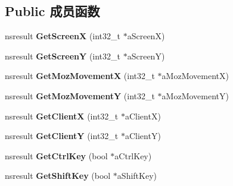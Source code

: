 \subsection*{Public 成员函数}
\begin{DoxyCompactItemize}
\item 
\mbox{\label{interfacens_i_d_o_m_mouse_event_ad8e732ec26ae471ddb1b8fcf50f2270b}} 
nsresult {\bfseries Get\+ScreenX} (int32\+\_\+t $\ast$a\+ScreenX)
\item 
\mbox{\label{interfacens_i_d_o_m_mouse_event_a87badc3e6e93d45ec315e3f288113afd}} 
nsresult {\bfseries Get\+ScreenY} (int32\+\_\+t $\ast$a\+ScreenY)
\item 
\mbox{\label{interfacens_i_d_o_m_mouse_event_aa1742956f4f5a3d533271fd10fb814ae}} 
nsresult {\bfseries Get\+Moz\+MovementX} (int32\+\_\+t $\ast$a\+Moz\+MovementX)
\item 
\mbox{\label{interfacens_i_d_o_m_mouse_event_a466af9f80521d7b8d35a3c8753a62022}} 
nsresult {\bfseries Get\+Moz\+MovementY} (int32\+\_\+t $\ast$a\+Moz\+MovementY)
\item 
\mbox{\label{interfacens_i_d_o_m_mouse_event_ad8be33b80bbcd5c708412f906a0bf945}} 
nsresult {\bfseries Get\+ClientX} (int32\+\_\+t $\ast$a\+ClientX)
\item 
\mbox{\label{interfacens_i_d_o_m_mouse_event_a90669099b3e83431f1123aac6d53b6e0}} 
nsresult {\bfseries Get\+ClientY} (int32\+\_\+t $\ast$a\+ClientY)
\item 
\mbox{\label{interfacens_i_d_o_m_mouse_event_a0a68a3ce1f540c61918769e7ec7ae90c}} 
nsresult {\bfseries Get\+Ctrl\+Key} (bool $\ast$a\+Ctrl\+Key)
\item 
\mbox{\label{interfacens_i_d_o_m_mouse_event_ad33fb9a6b76ba7626b519e2a13e36a45}} 
nsresult {\bfseries Get\+Shift\+Key} (bool $\ast$a\+Shift\+Key)
\item 
\mbox{\label{interfacens_i_d_o_m_mouse_event_a5b136f59713afaf192089800473166c8}} 

\end{DoxyCompactItemize}

